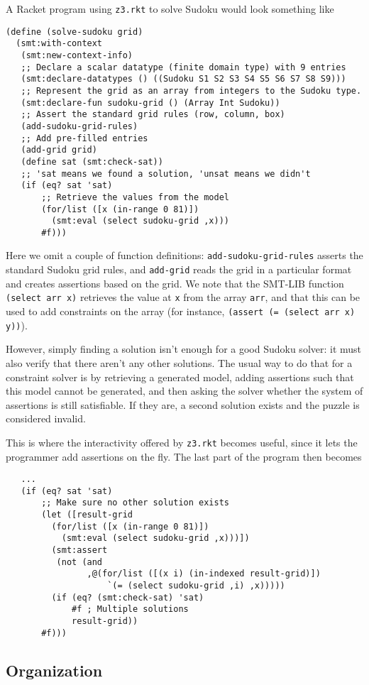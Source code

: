 A Racket program using \texttt{z3.rkt} to solve Sudoku would look something like

\begin{verbatim}
(define (solve-sudoku grid)
  (smt:with-context
   (smt:new-context-info)
   ;; Declare a scalar datatype (finite domain type) with 9 entries
   (smt:declare-datatypes () ((Sudoku S1 S2 S3 S4 S5 S6 S7 S8 S9)))
   ;; Represent the grid as an array from integers to the Sudoku type.
   (smt:declare-fun sudoku-grid () (Array Int Sudoku))
   ;; Assert the standard grid rules (row, column, box)
   (add-sudoku-grid-rules)
   ;; Add pre-filled entries
   (add-grid grid)
   (define sat (smt:check-sat))
   ;; 'sat means we found a solution, 'unsat means we didn't
   (if (eq? sat 'sat)
       ;; Retrieve the values from the model
       (for/list ([x (in-range 0 81)])
         (smt:eval (select sudoku-grid ,x)))
       #f)))
\end{verbatim}

Here we omit a couple of function definitions: \texttt{add-sudoku-grid-rules}
asserts the standard Sudoku grid rules, and \texttt{add-grid} reads the grid in
a particular format and creates assertions based on the grid. We note that the
SMT-LIB function \texttt{(select arr x)} retrieves the value at \texttt{x} from
the array \texttt{arr}, and that this can be used to add constraints on the
array (for instance, \texttt{(assert (= (select arr x) y))}).

However, simply finding a solution isn't enough for a good Sudoku solver: it
must also verify that there aren't any other solutions. The usual way to do that
for a constraint solver is by retrieving a generated model, adding assertions
such that this model cannot be generated, and then asking the solver whether the
system of assertions is still satisfiable. If they are, a second solution
exists and the puzzle is considered invalid.

This is where the interactivity offered by \texttt{z3.rkt} becomes useful, since
it lets the programmer add assertions on the fly. The last part of the program
then becomes

\begin{verbatim}
   ...
   (if (eq? sat 'sat)
       ;; Make sure no other solution exists
       (let ([result-grid
         (for/list ([x (in-range 0 81)])
           (smt:eval (select sudoku-grid ,x)))])
         (smt:assert
          (not (and
                ,@(for/list ([(x i) (in-indexed result-grid)])
                    `(= (select sudoku-grid ,i) ,x)))))
         (if (eq? (smt:check-sat) 'sat)
             #f ; Multiple solutions
             result-grid))
       #f)))
\end{verbatim}



\subsection{Organization}
